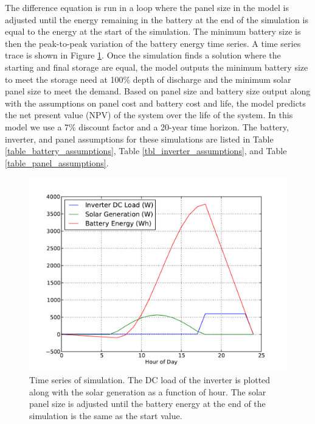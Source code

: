 \documentclass[conference]{IEEEtran}
\begin{document}
The difference equation is run in a loop where the
panel size in the model is adjusted until the energy remaining
in the battery at the end of the simulation is equal to the
energy at the start of the simulation.
The minimum battery size is then the peak-to-peak variation
of the battery energy time series.
A time series trace is shown in Figure \ref{simulation}.
Once the simulation finds a solution where the starting and final
storage are equal, the model outputs the minimum battery size
to meet the storage need at 100\% depth of discharge and the
minimum solar panel size to meet the demand.
Based on panel size and battery size output along with the
assumptions on panel cost and battery cost and life, the model
predicts the net present value (NPV) of the system over the
life of the system.
In this model we use a 7\% discount factor and a 20-year time
horizon.
The battery, inverter, and panel assumptions for these simulations are listed in
Table \ref{table_battery_assumptions},
Table \ref{tbl_inverter_assumptions},
and Table \ref{table_panel_assumptions}.

\begin{figure}[h]
\begin{center}
\includegraphics[trim = 0.0in 0.2in 0.0in 0.5in, clip, width=\columnwidth]{figures/simulation.pdf}
\end{center}
\caption{
Time series of simulation.
The DC load of the inverter is plotted along with the solar generation
as a function of hour.
The solar panel size is adjusted until the battery energy at the end
of the simulation is the same as the start value.
}
\label{simulation}
\end{figure}
\end{document}
